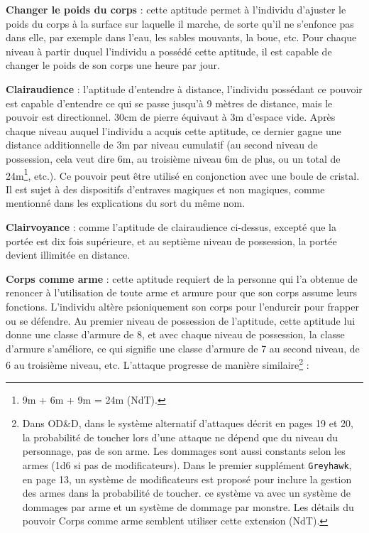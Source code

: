 \documentclass[11pt]{article}
\begin{document}
{\bigskip

\textbf{Changer le poids du corps} : cette aptitude permet à l'individu d'ajuster le poids du corps à la surface sur laquelle il marche, de sorte qu'il ne s'enfonce pas dans elle, par exemple dans l'eau, les sables mouvants, la boue, etc. Pour chaque niveau à partir duquel l'individu a possédé cette aptitude, il est capable de changer le poids de son corps une heure par jour.

\bigskip

\textbf{Clairaudience} : l'aptitude d'entendre à distance, l'individu possédant ce pouvoir est capable d'entendre ce qui se passe jusqu'à 9 mètres de distance, mais le pouvoir est directionnel. 30cm de pierre équivaut à 3m d'espace vide. Après chaque niveau auquel l'individu a acquis cette aptitude, ce dernier gagne une distance additionnelle de 3m par niveau cumulatif (au second niveau de possession, cela veut dire 6m, au troisième niveau 6m de plus, ou un total de 24m\footnote{9m + 6m + 9m = 24m (NdT).}, etc.). Ce pouvoir peut être utilisé en conjonction avec une boule de cristal. Il est sujet à des dispositifs d'entraves magiques et non magiques, comme mentionné dans les explications du sort du même nom.

\bigskip

\textbf{Clairvoyance} : comme l'aptitude de clairaudience ci-dessus, excepté que la portée est dix fois supérieure, et au septième niveau de possession, la portée devient illimitée en distance.

\bigskip

\textbf{Corps comme arme} : cette aptitude requiert de la personne qui l'a obtenue de renoncer à l'utilisation de toute arme et armure pour que son corps assume leurs fonctions. L'individu altère psioniquement son corps pour l'endurcir pour frapper ou se défendre. Au premier niveau de possession de l'aptitude, cette aptitude lui donne une classe d'armure de 8, et avec chaque niveau de possession, la classe d'armure s'améliore, ce qui signifie une classe d'armure de 7 au second niveau, de 6 au troisième niveau, etc. L'attaque progresse de manière similaire\footnote{Dans OD\&D, dans le système alternatif d'attaques décrit en pages 19 et 20, la probabilité de toucher lors d'une attaque ne dépend que du niveau du personnage, pas de son arme. Les dommages sont aussi constants selon les armes (1d6 si pas de modificateurs). Dans le premier supplément \texttt{Greyhawk}, en page 13, un système de modificateurs est proposé pour inclure la gestion des armes dans la probabilité de toucher. ce système va avec un système de dommages par arme et un système de dommage par monstre. Les détails du pouvoir Corps comme arme semblent utiliser cette extension (NdT). } :

}
\end{document}
